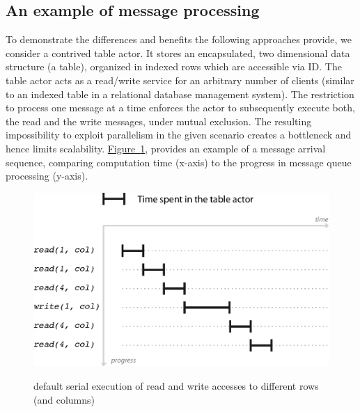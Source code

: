 \documentclass[11pt, journal]{IEEEtran}
\newcommand{\figref}[1]{\hyperref[{fig:#1}]{Figure~\ref*{fig:#1}}}
\begin{document}
\subsection{An example of message processing}\label{subsec:example}To demonstrate the differences and benefits the following approaches provide, we consider a contrived table actor. It stores an encapsulated, two dimensional data structure (a table), organized in indexed rows which are accessible via ID. The table actor acts as a read/write service for an arbitrary number of clients (similar to an indexed table in a relational database management system). The restriction to process one message at a time enforces the actor to subsequently execute both, the read and the write messages, under mutual exclusion. The resulting impossibility to exploit parallelism in the given scenario creates a bottleneck and hence limits scalability. \figref{serialprocessing}, provides an example of a message arrival sequence, comparing computation time (x-axis) to the progress in message queue processing (y-axis).

\begin{figure}[!htbp]
	\centering
	\includegraphics[width=\columnwidth]{figures/processing-01.eps}
	\begin{caption} {default serial execution of read and} write accesses to different rows (and columns)\label{fig:serialprocessing}\end{caption}
\end{figure}
\end{document}
